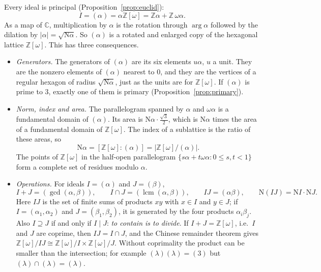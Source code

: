 \documentclass[11pt]{article}
\numberwithin{equation}{section}
\newcommand{\N}{\mathrm N}
\newcommand{\OO}{\mathbb Z[\omega]}
\newcommand{\Z}{\mathbb Z}
\theoremstyle{definition}
\theoremstyle{remark}
\begin{document}
Every ideal is principal (Proposition~\ref{prop:euclid}):
\begin{equation}\label{eq:principal}
 I=(\alpha)=\alpha\OO=\Z\alpha+\Z\,\omega\alpha .
\end{equation}
As a map of $\mathbb C$, multiplication by $\alpha$ is the rotation through $\arg\alpha$ followed by the
dilation by $|\alpha|=\sqrt{\N\alpha}$. So $(\alpha)$ is a rotated and enlarged copy of the hexagonal
lattice $\OO$. This has three consequences.
\begin{itemize}
\item \emph{Generators.} The generators of $(\alpha)$ are its six elements $u\alpha$, $u$ a unit. They are
the nonzero elements of $(\alpha)$ nearest to $0$, and they are the vertices of a regular hexagon of radius
$\sqrt{\N\alpha}$, just as the units are for $\OO$. If $(\alpha)$ is prime to $3$, exactly one of them is
primary (Proposition~\ref{prop:primary}).
\item \emph{Norm, index and area.} The parallelogram spanned by $\alpha$ and $\omega\alpha$ is a fundamental
domain of $(\alpha)$. Its area is $\N\alpha\cdot\frac{\sqrt3}2$, which is $\N\alpha$ times the area of a
fundamental domain of $\OO$. The index of a sublattice is the ratio of these areas, so
\begin{equation}\label{eq:index}
 \N\alpha=[\OO:(\alpha)]=|\OO/(\alpha)| .
\end{equation}
The points of $\OO$ in the half-open parallelogram $\{s\alpha+t\omega\alpha:0\le s,t<1\}$ form a complete
set of residues modulo $\alpha$.
\item \emph{Operations.} For ideals $I=(\alpha)$ and $J=(\beta)$,
\begin{equation}\label{eq:idealops}
 I+J=(\gcd(\alpha,\beta)),\qquad I\cap J=(\operatorname{lcm}(\alpha,\beta)),\qquad IJ=(\alpha\beta),\qquad
 \N(IJ)=\N I\cdot\N J .
\end{equation}
Here $IJ$ is the set of finite sums of products $xy$ with $x\in I$ and $y\in J$; if $I=(\alpha_1,\alpha_2)$ and
$J=(\beta_1,\beta_2)$, it is generated by the four products $\alpha_i\beta_j$. Also $I\supseteq J$ if and only
if $I\mid J$: \emph{to contain is to divide}. If $I+J=\OO$, i.e.\ $I$ and $J$ are coprime, then $IJ=I\cap J$,
and the Chinese remainder theorem gives $\OO/IJ\cong\OO/I\times\OO/J$. Without coprimality the product can be
smaller than the intersection; for example $(\lambda)(\lambda)=(3)$ but $(\lambda)\cap(\lambda)=(\lambda)$.
\end{itemize}
\end{document}
